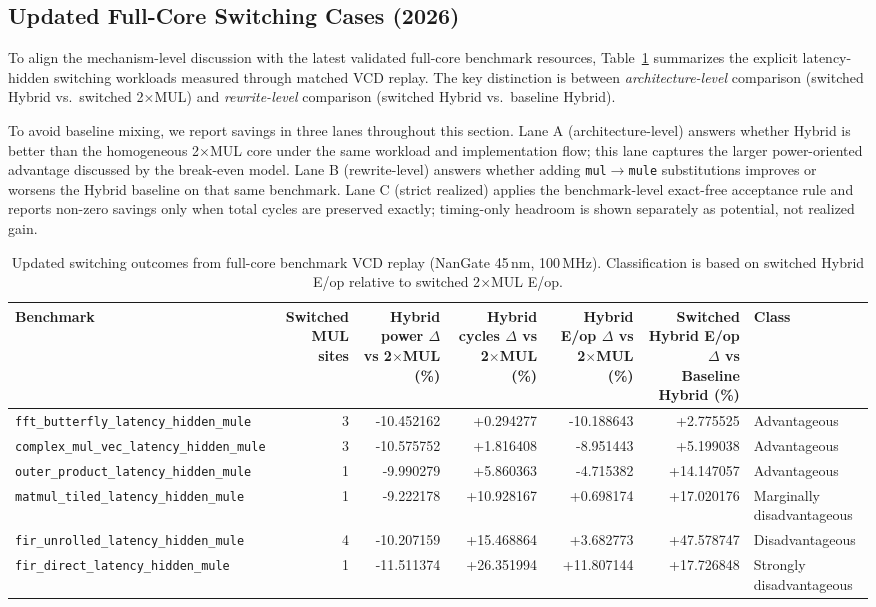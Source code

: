 \subsection{Updated Full-Core Switching Cases (2026)}
\label{sec:eval:switching2026}

To align the mechanism-level discussion with the latest validated
full-core benchmark resources, Table~\ref{tab:switching_cases_update}
summarizes the explicit latency-hidden switching workloads measured
through matched VCD replay. The key distinction is between
\emph{architecture-level} comparison (switched Hybrid vs.\ switched
2$\times$MUL) and \emph{rewrite-level} comparison (switched Hybrid
vs.\ baseline Hybrid).

To avoid baseline mixing, we report savings in three lanes throughout this
section. Lane A (architecture-level) answers whether Hybrid is better than the
homogeneous 2$\times$MUL core under the same workload and implementation flow;
this lane captures the larger power-oriented advantage discussed by the
break-even model. Lane B (rewrite-level) answers whether adding
\texttt{mul}$\rightarrow$\texttt{mule} substitutions improves or worsens the
Hybrid baseline on that same benchmark. Lane C (strict realized) applies the
benchmark-level exact-free acceptance rule and reports non-zero savings only
when total cycles are preserved exactly; timing-only headroom is shown
separately as potential, not realized gain.

\begin{table}[t]
\centering
\caption{Updated switching outcomes from full-core benchmark VCD replay
(NanGate 45\,nm, 100\,MHz). Classification is based on switched Hybrid
E/op relative to switched 2$\times$MUL E/op.}
\label{tab:switching_cases_update}
\small
\begin{tabular}{l r r r r r l}
\toprule
Benchmark & Switched MUL sites & Hybrid power $\Delta$ vs 2$\times$MUL (\%) & Hybrid cycles $\Delta$ vs 2$\times$MUL (\%) & Hybrid E/op $\Delta$ vs 2$\times$MUL (\%) & Switched Hybrid E/op $\Delta$ vs Baseline Hybrid (\%) & Class \\
\midrule
\texttt{fft\_butterfly\_latency\_hidden\_mule} & 3 & -10.452162 & +0.294277 & -10.188643 & +2.775525 & Advantageous \\
\texttt{complex\_mul\_vec\_latency\_hidden\_mule} & 3 & -10.575752 & +1.816408 & -8.951443 & +5.199038 & Advantageous \\
\texttt{outer\_product\_latency\_hidden\_mule} & 1 & -9.990279 & +5.860363 & -4.715382 & +14.147057 & Advantageous \\
\texttt{matmul\_tiled\_latency\_hidden\_mule} & 1 & -9.222178 & +10.928167 & +0.698174 & +17.020176 & Marginally disadvantageous \\
\texttt{fir\_unrolled\_latency\_hidden\_mule} & 4 & -10.207159 & +15.468864 & +3.682773 & +47.578747 & Disadvantageous \\
\texttt{fir\_direct\_latency\_hidden\_mule} & 1 & -11.511374 & +26.351994 & +11.807144 & +17.726848 & Strongly disadvantageous \\
\bottomrule
\end{tabular}
\end{table}

